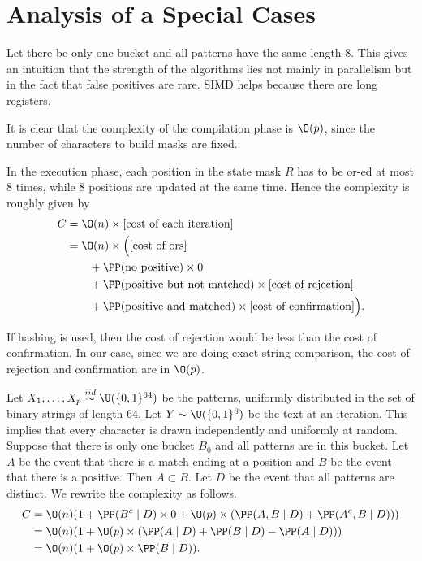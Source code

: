 \section{Analysis of a Special Cases}

Let there be only one bucket and all patterns have the same length $8$. This gives an intuition that the strength of the algorithms lies not mainly in parallelism but in the fact that false positives are rare. SIMD helps because there are long registers.

It is clear that the complexity of the compilation phase is $\O(p)$, since the number of characters to build masks are fixed.

In the execution phase, each position in the state mask $R$ has to be or-ed at most $8$ times, while $8$ positions are updated at the same time. Hence the complexity is roughly given by
\[
  \begin{aligned}
    C & = \O\!\left(n\right)\times [\text{cost of each iteration}]                           \\
      & = \O(n)\times\Big( [\text{cost of ors}]                                              \\
      & \qquad + \PP(\text{no positive})\times 0                                             \\
      & \qquad + \PP(\text{positive but not matched})\times[\text{cost of rejection}]        \\
      & \qquad + \PP(\text{positive and matched})\times [\text{cost of confirmation}] \Big).
  \end{aligned}
\]

If hashing is used, then the cost of rejection would be less than the cost of confirmation. In our case, since we are doing exact string comparison, the cost of rejection and confirmation are in $\O(p)$.

Let $X_1,\ldots,X_p\overset{iid}{\sim}\U(\{0,1\}^{64})$ be the patterns, uniformly distributed in the set of binary strings of length $64$. Let $Y\sim \U(\{0,1\}^{8})$ be the text at an iteration. This implies that every character is drawn independently and uniformly at random. Suppose that there is only one bucket $B_0$ and all patterns are in this bucket. Let $A$ be the event that there is a match ending at a position and $B$ be the event that there is a positive. Then $A\subset B$. Let $D$ be the event that all patterns are distinct. We rewrite the complexity as follows.
\begin{align*}
  C & = \O(n)(1 + \PP(B^c\mid D)\times 0 + \O(p)\times (\PP(A,B\mid D) + \PP(A^c,B\mid D))) \\
    & = \O(n)(1 + \O(p)\times (\PP(A\mid D) + \PP(B\mid D) - \PP(A\mid D)))                 \\
    & = \O(n)(1 + \O(p)\times \PP(B\mid D)).
\end{align*}

